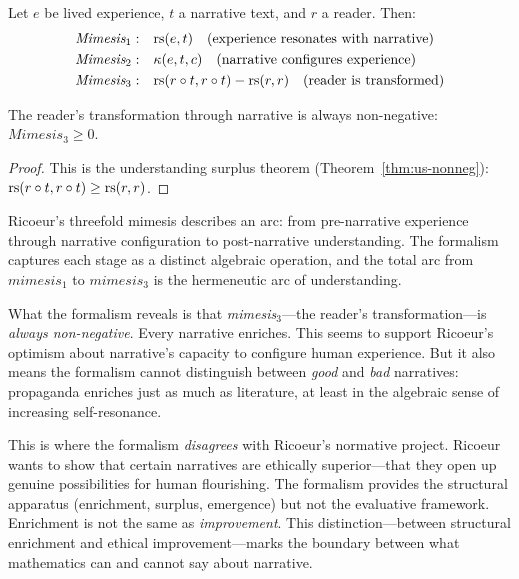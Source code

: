 \begin{definition}
\label{def:mimesis}
Let $e$ be lived experience, $t$ a narrative text, and $r$ a reader. Then:
\begin{align}
\textit{Mimesis}_1: &\quad \mathrm{rs}(e, t) \quad \text{(experience resonates with narrative)} \\
\textit{Mimesis}_2: &\quad \kappa(e, t, c) \quad \text{(narrative configures experience)} \\
\textit{Mimesis}_3: &\quad \mathrm{rs}(r \circ t, r \circ t) - \mathrm{rs}(r, r) \quad \text{(reader is transformed)}
\end{align}
\end{definition}

\begin{theorem}
\label{thm:mimesis3}
The reader's transformation through narrative is always non-negative:
$\textit{Mimesis}_3 \geq 0$.
\end{theorem}

\begin{proof}
This is the understanding surplus theorem (Theorem~\ref{thm:us-nonneg}):
$\mathrm{rs}(r \circ t, r \circ t) \geq \mathrm{rs}(r, r)$.
\end{proof}

\begin{interpretation}
Ricoeur's threefold mimesis describes an arc: from pre-narrative experience
through narrative configuration to post-narrative understanding. The
formalism captures each stage as a distinct algebraic operation, and the
total arc from $\textit{mimesis}_1$ to $\textit{mimesis}_3$ is the
hermeneutic arc of understanding.

What the formalism reveals is that \textit{mimesis}$_3$---the reader's
transformation---is \emph{always non-negative}. Every narrative enriches.
This seems to support Ricoeur's optimism about narrative's capacity to
configure human experience. But it also means the formalism cannot
distinguish between \emph{good} and \emph{bad} narratives: propaganda
enriches just as much as literature, at least in the algebraic sense of
increasing self-resonance.

This is where the formalism \emph{disagrees} with Ricoeur's normative
project. Ricoeur wants to show that certain narratives are ethically
superior---that they open up genuine possibilities for human flourishing.
The formalism provides the structural apparatus (enrichment, surplus,
emergence) but not the evaluative framework. Enrichment is not the same as
\emph{improvement}. This distinction---between structural enrichment and
ethical improvement---marks the boundary between what mathematics can and
cannot say about narrative.
\end{interpretation}

